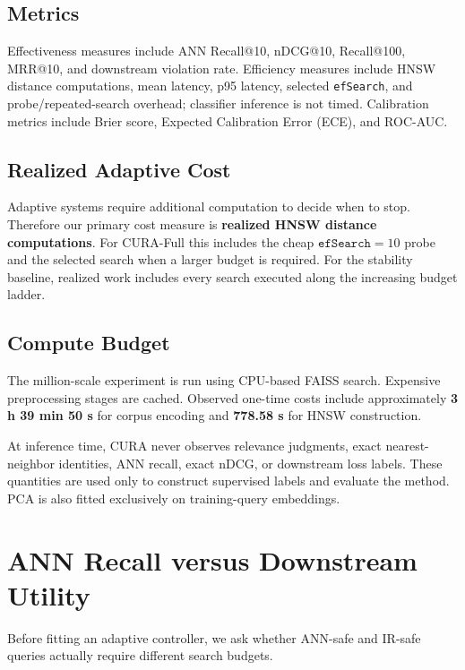 \documentclass[10pt,twocolumn]{article}
\newcommand{\cura}{CURA}
\newcommand{\ef}{\texttt{efSearch}}
\begin{document}
\subsection{Metrics}
Effectiveness measures include ANN Recall@10, nDCG@10, Recall@100, MRR@10, and downstream violation rate. Efficiency measures include HNSW distance computations, mean latency, p95 latency, selected \ef{}, and probe/repeated-search overhead; classifier inference is not timed. Calibration metrics include Brier score, Expected Calibration Error (ECE), and ROC-AUC.

\subsection{Realized Adaptive Cost}
Adaptive systems require additional computation to decide when to stop. Therefore our primary cost measure is \textbf{realized HNSW distance computations}. For \cura{}-Full this includes the cheap $\ef=10$ probe and the selected search when a larger budget is required. For the stability baseline, realized work includes every search executed along the increasing budget ladder.

\subsection{Compute Budget}
The million-scale experiment is run using CPU-based FAISS search. Expensive preprocessing stages are cached. Observed one-time costs include approximately \textbf{3 h 39 min 50 s} for corpus encoding and \textbf{778.58 s} for HNSW construction.

\begin{tcolorbox}[colback=RiskLight,colframe=RiskRed,title=\textbf{Leakage Control},fonttitle=\small,boxrule=0.8pt]
\small
At inference time, \cura{} never observes relevance judgments, exact nearest-neighbor identities, ANN recall, exact nDCG, or downstream loss labels. These quantities are used only to construct supervised labels and evaluate the method. PCA is also fitted exclusively on training-query embeddings.
\end{tcolorbox}

\section{ANN Recall versus Downstream Utility}
\label{sec:oracle}
Before fitting an adaptive controller, we ask whether ANN-safe and IR-safe queries actually require different search budgets.
\end{document}
